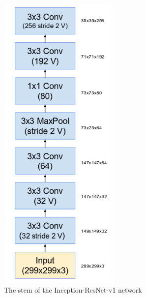\documentclass[a4paper,12pt, twoside]{NITKReport}
\begin{document}
\begin{figure}
\centering
\begin{minipage}[b]{0.4\textwidth}
   \includegraphics[height=15cm,width=6cm]{figure14.png}
    \caption{The stem of the Inception-ResNet-v1 network}
    \label{14}
  \end{minipage}
  \hfill
  \begin{minipage}[b]{0.4\textwidth}

\end{minipage}
\end{figure}
\end{document}
